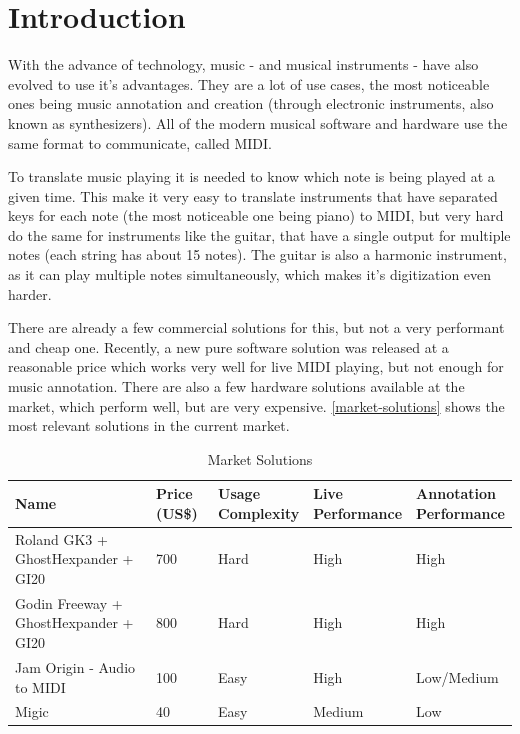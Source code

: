 \chapter[Introduction]{Introduction}
With the advance of technology, music - and musical instruments - have also evolved to
use it's advantages. They are a lot of use cases, the most noticeable ones being music
annotation and creation (through electronic instruments, also known as synthesizers).
All of the modern musical software and hardware use the same format to communicate,
called MIDI.

To translate music playing it is needed to know which note is being played at a
given time. This make it very easy to translate instruments that have separated
keys for each note (the most noticeable one being piano) to MIDI, but very hard
do the same for instruments like the guitar, that have a single output for multiple
notes (each string has about 15 notes). The guitar is also a harmonic instrument,
as it can play multiple notes simultaneously, which makes it's digitization even harder.

There are already a few commercial solutions for this, but not a very performant
and cheap one. Recently, a new pure software solution was released at a reasonable
price which works very well for live MIDI playing, but not enough for music annotation.
There are also a few hardware solutions available at the market, which perform well,
but are very expensive. \autoref{market-solutions} shows the most relevant solutions
in the current market.

\begin{table}[htb]
  \begin{center}
    \ABNTEXreducedfont
    \caption[Market Solutions]{Market Solutions}
    \label{market-solutions}
    \begin{tabular}{m{4 cm} | m{1 cm} | m{2 cm} | m{2 cm} | m{2 cm} }
      \hline
      Name & Price (US\$) & \pbox{2 cm}{Usage\\Complexity} & \pbox{2 cm}{Live\\Performance} & \pbox{2 cm}{Annotation\\Performance}\\
      \hline \hline
      Roland GK3 + GhostHexpander + GI20 & 700 & Hard & High & High \\
      Godin Freeway + GhostHexpander + GI20 & 800 & Hard & High & High \\
      Jam Origin - Audio to MIDI & 100 & Easy & High & Low/Medium \\
      Migic & 40 & Easy & Medium & Low \\
      \hline
    \end{tabular}
  \end{center}
\end{table}

